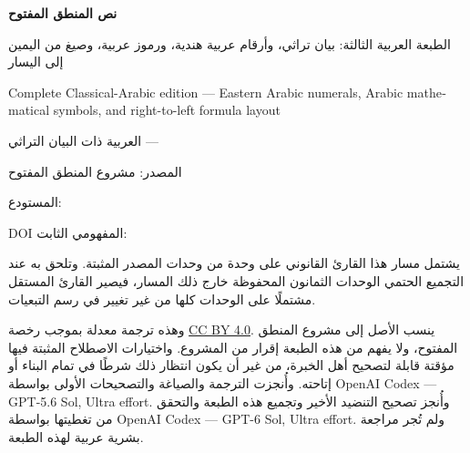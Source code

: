 \documentclass[openany]{memoir}
\newcommand*{\OLCompleteEditionSubtitle}
  {الطبعة العربية الثالثة: بيان تراثي، وأرقام عربية هندية، ورموز عربية، وصيغ من اليمين إلى اليسار}
\newcommand*{\OLReleaseConceptDOI}{10.5281/zenodo.21921850}
\newcommand*{\OLReleaseRepository}{https://github.com/KokunoYumeto/OpenLogic-ar}
\begin{document}
\begin{titlingpage}
\begin{center}
\vspace*{2.5cm}
{\HUGE\bfseries\sffamily نص المنطق المفتوح\par}
\vspace{1.2cm}
{\huge \OLCompleteEditionSubtitle\par}
\vspace{0.6cm}
{\large\foreignlanguage{english}{%
  Complete Classical-Arabic edition --- Eastern Arabic numerals, Arabic
  mathematical symbols, and right-to-left formula layout}\par}
\vspace{1.3cm}
{\Large العربية ذات البيان التراثي --- \par}
\vspace{1.2cm}
{\large المصدر: مشروع المنطق المفتوح\par}
\vspace{0.5cm}
{\large المستودع: \href{\OLReleaseRepository}{}\par}
{\large DOI المفهومي الثابت: \babelsublr{\OLReleaseConceptDOI}\par}
\end{center}

\vfill

\noindent
يشتمل مسار هذا القارئ القانوني على  وحدة من
وحدات المصدر المثبتة. وتلحق به عند التجميع الحتمي الوحدات الثمانون
المحفوظة خارج ذلك المسار، فيصير القارئ المستقل مشتملًا على الوحدات
 كلها من غير تغيير في رسم التبعيات.

\medskip
\noindent
وهذه ترجمة معدلة بموجب رخصة
\href{https://creativecommons.org/licenses/by/4.0/}{CC BY 4.0}.
ينسب الأصل إلى مشروع المنطق المفتوح، ولا يفهم من هذه الطبعة إقرار من
المشروع. واختيارات الاصطلاح المثبتة فيها مؤقتة قابلة لتصحيح أهل الخبرة،
من غير أن يكون انتظار ذلك شرطًا في تمام البناء أو إتاحته.
وأُنجزت الترجمة والصياغة والتصحيحات الأولى بواسطة
\foreignlanguage{english}{OpenAI Codex — GPT-5.6 Sol, Ultra effort}.
وأُنجز تصحيح التنضيد الأخير وتجميع هذه الطبعة والتحقق من تغطيتها بواسطة
\foreignlanguage{english}{OpenAI Codex — GPT-6 Sol, Ultra effort}.
ولم تُجر مراجعة بشرية عربية لهذه الطبعة.

\end{titlingpage}

\pagestyle{giheadings}



\tableofcontents*



\photocredits

\nocite{Frege1953,Peter1967}


\end{document}
